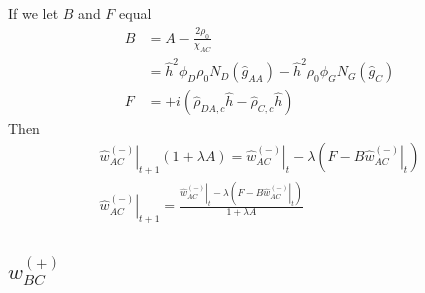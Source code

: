 \documentclass{article}
\begin{document}
  If we let $B$ and $F$ equal
  \begin{align*}
    B &= A - \frac{2\rho_0}{\chi_{AC}} \\
      &=\hat{h}^2 \phi_D \rho_0 N_D
        (\hat{g}_{AA}) 
        -  \hat{h} ^2  {\rho}_0  
          \phi_G N_G (\hat{g}_{C}) 
          \\
    F &= + i ( \hat{\rho}_{DA,c} \hat{h}
              - \hat{\rho}_{C,c} \hat{h} )
  \end{align*}
  Then
  \begin{align*}
    \left. \hat{w}_{AC}^{(-)} \right|_{t+1} ( 1 + \lambda A ) =
      \left. \hat{w}_{AC}^{(-)} \right|_t
      - \lambda \left( F - B \left. \hat{w}_{AC}^{(-)} \right|_t \right) \\
    \left. \hat{w}_{AC}^{(-)} \right|_{t+1} =
    \frac{\left. \hat{w}_{AC}^{(-)} \right|_t - \lambda
            \left( F - B \left. \hat{w}_{AC}^{(-)} \right|_t \right)}
         {1 + \lambda A}
  \end{align*}


  \subsection{$w_{BC}^{(+)}$}
\end{document}
